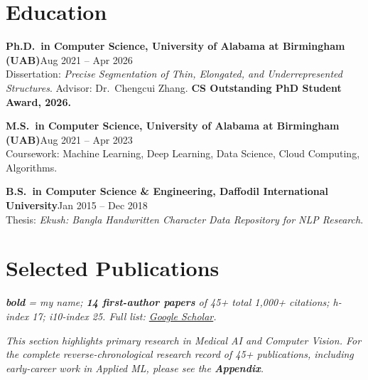 \documentclass[11pt]{article}
\newcommand{\cventry}[3]{%
  \noindent\textbf{#1}\hfill #2\\
  \noindent #3 \par
}
\begin{document}
\section{Education}
\cventry
{Ph.D.\ in Computer Science, University of Alabama at Birmingham (UAB)}
{Aug 2021 -- Apr 2026}
{Dissertation: \textit{Precise Segmentation of Thin, Elongated, and Underrepresented Structures}. Advisor: Dr.\ Chengcui Zhang. \textbf{CS Outstanding PhD Student Award, 2026.}}

\cventry
{M.S.\ in Computer Science, University of Alabama at Birmingham (UAB)}
{Aug 2021 -- Apr 2023}
{Coursework: Machine Learning, Deep Learning, Data Science, Cloud Computing, Algorithms.}

\cventry
{B.S.\ in Computer Science \& Engineering, Daffodil International University}
{Jan 2015 -- Dec 2018}
{Thesis: \textit{Ekush: Bangla Handwritten Character Data Repository for NLP Research}.}

\section{Selected Publications}
\textit{\textbf{bold} = my name; \textbf{14 first-author papers} of 45+ total \textemdash{} 1,000+ citations; h-index 17; i10-index 25. Full list: \href{https://scholar.google.com/citations?user=_Rm1Xk4AAAAJ&hl=en}{Google Scholar}.}

\noindent\textit{This section highlights primary research in Medical AI and Computer Vision. For the complete reverse-chronological research record of 45+ publications, including early-career work in Applied ML, please see the \textbf{Appendix}.}
\end{document}
